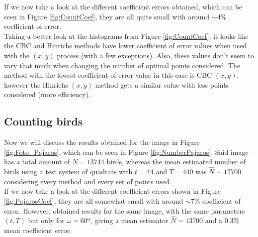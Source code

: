 
If we now take a look at the different coefficient errors obtained, which can be seen in Figure \ref{fig:CountCoef}, they are all quite small with around $\sim 4$\% coefficient of error.\\ %


Taking a better look at the histograms from Figure \ref{fig:CountCoef}, it looks like the CBC and Hinrichs methods have lower coefficient of error values when used with the $(x,y)$ process (with a few exceptions). Also, these values don't seem to vary that much when changing the number of optimal points considered. The method with the lowest coefficient of error value in this case is CBC $(x,y)$, however the Hinrichs $(x,y)$ method gets a similar value with less points considered (more efficiency).\\







\subsection{Counting birds}
Now we will discuss the results obtained for the image in Figure \ref{fig:Foto_Pajaros}, which can be seen in Figure \ref{fig:NumberPajaros}. Said image has a total amount of $N=13744$ birds, whereas the mean estimated number of birds using a test system of quadrats with $t=44$ and $T=440$ was $\widehat{N}\sim 12700$ considering every method and every set of points used.\\


If we now take a look at the different coefficient errors shown in Figure \ref{fig:PajarosCoef}, they are all somewhat small with around $\sim 7$\% coefficient of error. However, \cite{conteo.pdf} obtained results for the same image, with the same parameters $(t,T)$ but only for $\omega = 60$º, giving a mean estimator $\widehat{N}=13700$ and a $0.3$\% mean coefficient error.\\ %


